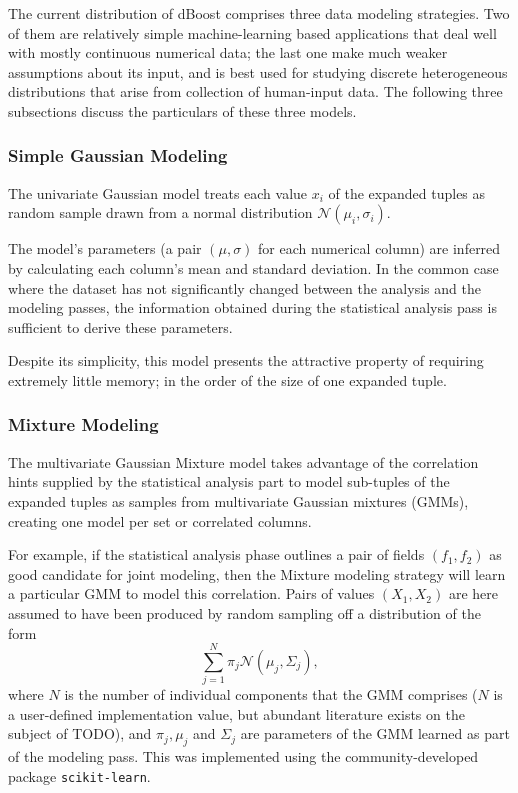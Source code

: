 The current distribution of dBoost comprises three data modeling strategies. Two of them are relatively simple machine-learning based applications that deal well with mostly continuous numerical data; the last one make much weaker assumptions about its input, and is best used for studying discrete heterogeneous distributions that arise from collection of human-input data. The following three subsections discuss the particulars of these three models.

\subsubsection{Simple Gaussian Modeling}
\label{sec:gaus_model}
The univariate Gaussian model treats each value $x_i$ of the expanded tuples as random sample drawn from a normal distribution $\mathcal N(\mu_i, \sigma_i)$.

The model's parameters (a pair $(\mu, \sigma)$ for each numerical column) are inferred by calculating each column's mean and standard deviation. In the common case where the dataset has not significantly changed between the analysis and the modeling passes, the information obtained during the statistical analysis pass is sufficient to derive these parameters.

Despite its simplicity, this model presents the attractive property of requiring extremely little memory; in the order of the size of one expanded tuple.

\subsubsection{Mixture Modeling}
The multivariate Gaussian Mixture model takes advantage of the correlation hints supplied by the statistical analysis part to model sub-tuples of the expanded tuples as samples from multivariate Gaussian mixtures (GMMs), creating one model per set or correlated columns.

For example, if the statistical analysis phase outlines a pair of fields $(f_1, f_2)$ as good candidate for joint modeling, then the Mixture modeling strategy will learn a particular GMM to model this correlation. Pairs of values $(X_1, X_2)$ are here assumed to have been produced by random sampling off a distribution of the form
\[ \sum_{j=1}^{N} \pi_j \mathcal N(\mu_j, \Sigma_j), \]
where $N$ is the number of individual components that the GMM comprises ($N$ is a user-defined implementation value, but abundant literature exists on the subject of TODO), and $\pi_j, \mu_j$ and $\Sigma_j$ are parameters of the GMM learned as part of the modeling pass. This was implemented using the community-developed package \texttt{scikit-learn}. 

